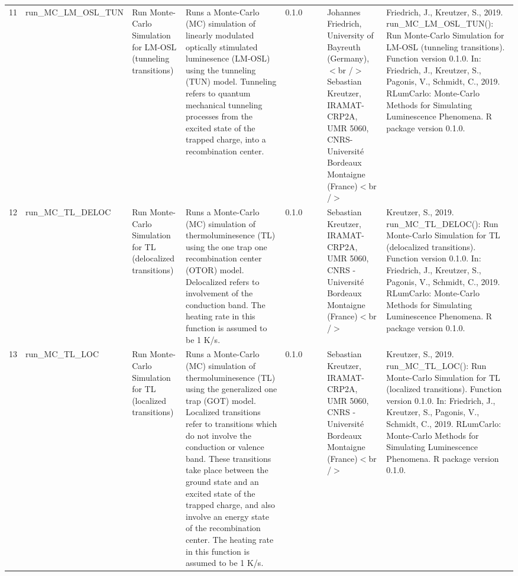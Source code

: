 \begin{table}[ht]
\begin{tabular}{rllllllll}
 \\ 
  11 & run\_MC\_LM\_OSL\_TUN & Run Monte-Carlo Simulation for LM-OSL (tunneling transitions) & Runs a Monte-Carlo (MC) simulation of linearly modulated optically stimulated luminesence (LM-OSL) using the tunneling (TUN) model. Tunneling refers to quantum mechanical tunneling processes from the excited state of the trapped charge, into a recombination center. & 0.1.0
 &  &  & Johannes Friedrich, University of Bayreuth (Germany),$<$br /$>$ Sebastian Kreutzer, IRAMAT-CRP2A, UMR 5060, CNRS-Université Bordeaux Montaigne (France)$<$br /$>$ & Friedrich, J., Kreutzer, S., 2019. run\_MC\_LM\_OSL\_TUN(): Run Monte-Carlo Simulation for LM-OSL (tunneling transitions). Function version 0.1.0. In: Friedrich, J., Kreutzer, S., Pagonis, V., Schmidt, C., 2019. RLumCarlo: Monte-Carlo Methods for Simulating Luminescence Phenomena. R package version 0.1.0. 
 \\ 
  12 & run\_MC\_TL\_DELOC & Run Monte-Carlo Simulation for TL (delocalized transitions) & Runs a Monte-Carlo (MC) simulation of thermoluminesence (TL) using the one trap one recombination center (OTOR) model. Delocalized refers to involvement of the conduction band. The heating rate in this function is assumed to be 1 K/s. & 0.1.0
 &  &  & Sebastian Kreutzer, IRAMAT-CRP2A, UMR 5060, CNRS - Université Bordeaux Montaigne (France)$<$br /$>$ & Kreutzer, S., 2019. run\_MC\_TL\_DELOC(): Run Monte-Carlo Simulation for TL (delocalized transitions). Function version 0.1.0. In: Friedrich, J., Kreutzer, S., Pagonis, V., Schmidt, C., 2019. RLumCarlo: Monte-Carlo Methods for Simulating Luminescence Phenomena. R package version 0.1.0. 
 \\ 
  13 & run\_MC\_TL\_LOC & Run Monte-Carlo Simulation for TL (localized transitions) & Runs a Monte-Carlo (MC) simulation of thermoluminesence (TL) using the generalized one trap (GOT) model. Localized transitions refer to transitions which do not involve the conduction or valence band. These transitions take place between the ground state and an excited state of the trapped charge, and also involve an energy state of the recombination center. The heating rate in this function is assumed to be 1 K/s. & 0.1.0
 &  &  & Sebastian Kreutzer, IRAMAT-CRP2A, UMR 5060, CNRS - Université Bordeaux Montaigne (France)$<$br /$>$ & Kreutzer, S., 2019. run\_MC\_TL\_LOC(): Run Monte-Carlo Simulation for TL (localized transitions). Function version 0.1.0. In: Friedrich, J., Kreutzer, S., Pagonis, V., Schmidt, C., 2019. RLumCarlo: Monte-Carlo Methods for Simulating Luminescence Phenomena. R package version 0.1.0. 

\end{tabular}
\end{table}
